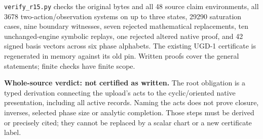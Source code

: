 \documentclass[11pt]{article}
\begin{document}
\texttt{verify\_r15.py} checks the original bytes and all 48 source claim
environments, all 3678 two-action/observation systems on up to three states,
29290 saturation cases, nine boundary witnesses, seven rejected mathematical
replacements, ten unchanged-engine symbolic replays, one rejected altered
native proof, and 42 signed basis vectors across six phase alphabets.
The existing UGD-1 certificate is regenerated in memory against its old pin.
Written proofs cover the general statements; finite checks have finite scope.

\textbf{Whole-source verdict: not certified as written.}
The root obligation is a typed derivation connecting the upload's acts to
the cyclic/oriented native presentation, including all active records.
Naming the acts does not prove closure, inverses, selected phase size or
analytic completion. Those steps must be derived or precisely cited;
they cannot be replaced by a scalar chart or a new certificate label.
\end{document}
